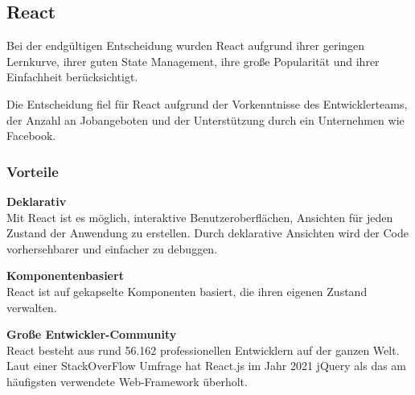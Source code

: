 




\subsection{React}
Bei der endgültigen Entscheidung wurden React aufgrund ihrer geringen Lernkurve, ihrer guten State Management, ihre große Popularität und ihrer Einfachheit berücksichtigt.

Die Entscheidung fiel für React aufgrund der Vorkenntnisse des Entwicklerteams, der Anzahl an Jobangeboten und der Unterstützung durch ein Unternehmen wie Facebook.


\subsubsection{Vorteile}
\textbf{Deklarativ} \\
Mit React ist es möglich, interaktive Benutzeroberflächen, Ansichten für jeden Zustand der Anwendung zu erstellen. %
Durch deklarative Ansichten wird der Code vorhersehbarer und einfacher zu debuggen.
\newline

\textbf{Komponentenbasiert}\\
React ist auf gekapselte Komponenten basiert, die ihren eigenen Zustand verwalten.
\newline

\textbf{Große Entwickler-Community}\\
React besteht aus rund 56.162 professionellen Entwicklern auf der ganzen Welt.
Laut einer StackOverFlow Umfrage hat React.js im Jahr 2021 jQuery als das am häufigsten verwendete Web-Framework überholt. {\cite{SO01}}
\newpage

